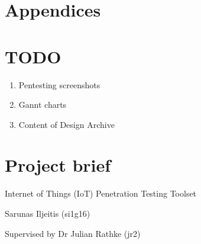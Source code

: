 \documentclass{article}
\begin{document}



\newpage
\tableofcontents

\newpage



\newpage









% 
\newpage


\section{Appendices}
\appendix


\section{TODO}
\begin{enumerate}
	\item Pentesting screenshots
	\item Gannt charts
	\item Content of Design Archive
\end{enumerate}


\section{Project brief}\label{sec:appendix-preject-brief}

Internet of Things (IoT) Penetration Testing Toolset

Sarunas Iljeitis (si1g16)

Supervised by Dr Julian Rathke (jr2)
\end{document}
